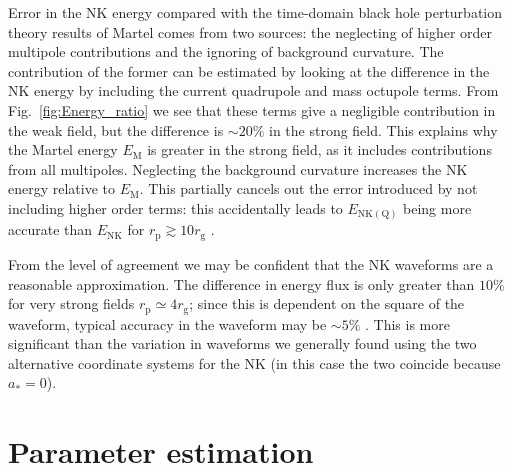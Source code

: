 \documentclass[useAMS,usedcolumn,usegraphicx,usenatbib]{mn2e}
\newcommand{\figref}[1]{Fig.~\ref{fig:#1}}
\newcommand{\sub}[1]{\ensuremath{_\mathrm{#1}}}
\begin{document}
Error in the NK energy compared with the time-domain black hole perturbation theory results of Martel comes from two sources: the neglecting of higher order multipole contributions and the ignoring of background curvature. The contribution of the former can be estimated by looking at the difference in the NK energy by including the current quadrupole and mass octupole terms. From \figref{Energy_ratio} we see that these terms give a negligible contribution in the weak field, but the difference is $\sim20\%$ in the strong field. This explains why the Martel energy $E\sub{M}$ is greater in the strong field, as it includes contributions from all multipoles. Neglecting the background curvature increases the NK energy relative to $E\sub{M}$. This partially cancels out the error introduced by not including higher order terms: this accidentally leads to $E\sub{NK(Q)}$ being more accurate than $E\sub{NK}$ for $r\sub{p} \gtrsim 10 r\sub{g}$ \citep{Tanaka1993}.

From the level of agreement we may be confident that the NK waveforms are a reasonable approximation. The difference in energy flux is only greater than $10\%$ for very strong fields $r\sub{p} \simeq 4 r\sub{g}$; since this is dependent on the square of the waveform, typical accuracy in the waveform may be $\sim 5\%$ \citep{Gair2005,Tanaka1993}. This is more significant than the variation in waveforms we generally found using the two alternative coordinate systems for the NK (in this case the two coincide because $a_\ast = 0$).

\section{Parameter estimation}
\end{document}
